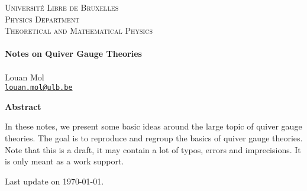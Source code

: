 \begin{titlepage}



	\begin{center}
	\textsc{\LARGE Université Libre de Bruxelles}\\[1.5cm]
	
	\textsc{\Large Physics Department}\\[0.5cm]
	
	\textsc{\large Theoretical and Mathematical Physics}\\[0.5cm]
	\HRule\\[0.8cm]
	
	{\huge\bfseries Notes on Quiver Gauge Theories}\\[0.7cm]
	
	\HRule\\[0.7cm]
	
	Louan Mol\\
	\href{mailto:louan.mol@ulb.be}{\texttt{louan.mol@ulb.be}}
	
	\vspace{3cm}
	
	{\large\textbf{Abstract}}
	\end{center}
	
	    \quad In these notes, we present some basic ideas around the large topic of quiver gauge theories.  The goal is to reproduce and regroup the basics of quiver gauge theories. Note that this is a draft, it may contain a lot of typos, errors and imprecisions. It is only meant as a work support.
	    
	\vfill

	\hfill Last update on \today.
	
\end{titlepage}